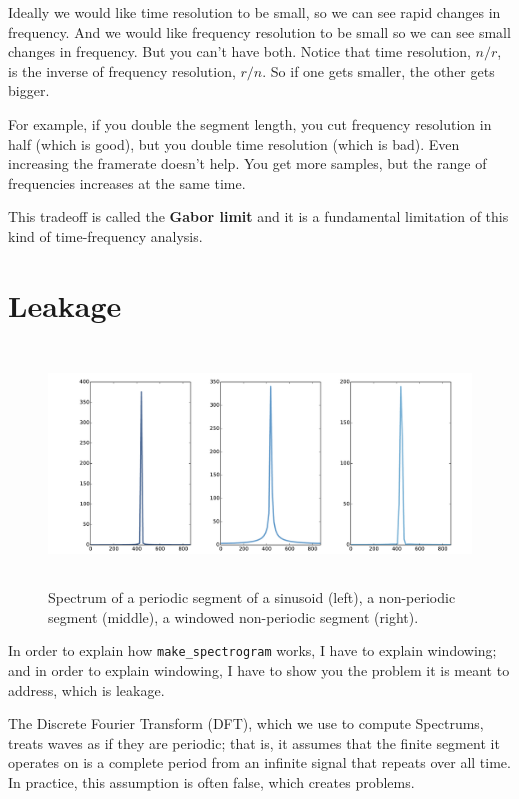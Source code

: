 \documentclass[12pt]{book}
\begin{document}
Ideally we would like time resolution to be small, so we can see rapid
changes in frequency.  And we would like frequency resolution to be
small so we can see small changes in frequency.  But you can't have
both.  Notice that time resolution, $n/r$, is the inverse of frequency
resolution, $r/n$.  So if one gets smaller, the other gets bigger.

For example, if you double the segment length, you cut frequency
resolution in half (which is good), but you double time resolution
(which is bad).  Even increasing the framerate doesn't help.  You get
more samples, but the range of frequencies increases at
the same time.

This tradeoff is called the {\bf Gabor limit} and it is a fundamental
limitation of this kind of time-frequency analysis.


\section{Leakage}

\begin{figure}
\centerline{\includegraphics[height=2.5in]{figs/windowing1.pdf}}
\caption{Spectrum of a periodic segment of a sinusoid (left), a
  non-periodic segment (middle), a windowed non-periodic segment
  (right).}
\label{fig.windowing1}
\end{figure}

In order to explain how \verb"make_spectrogram" works, I have
to explain windowing; and in order to explain windowing, I have to
show you the problem it is meant to address, which is leakage.

The Discrete Fourier Transform (DFT), which we use to compute
Spectrums, treats waves as if they are periodic; that is, it assumes
that the finite segment it operates on is a complete period from an
infinite signal that repeats over all time.  In practice, this
assumption is often false, which creates problems.
\end{document}
